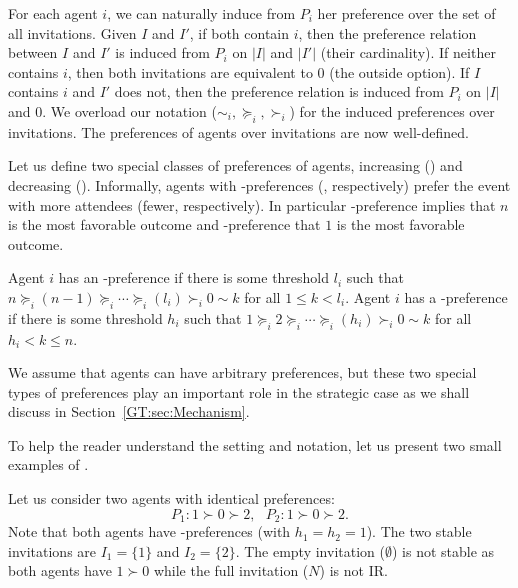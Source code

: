 For each agent $i$, we can naturally induce from $P_i$ her preference over the set of all invitations.
Given $I$ and $I'$, if both contain $i$, then the preference relation between $I$ and $I'$ is induced from $P_i$ on $|I|$ and $|I'|$ (their cardinality). If neither contains $i$, then both invitations are equivalent to $0$ (the outside option). If $I$ contains $i$ and $I'$ does not, then the preference relation is induced from $P_i$ on $|I|$ and $0$. 
We overload our notation ($\sim_i, \succeq_i, \succ_i$) for the induced preferences over invitations. 
The preferences of agents over invitations are now well-defined.

Let us define two special classes of preferences of agents, increasing (\INC) and decreasing (\DEC). Informally, agents with \INC-preferences (\DEC, respectively) prefer the event with more attendees (fewer, respectively). In particular \INC-preference implies that $n$ is the most favorable outcome and \DEC-preference that $1$ is the most favorable outcome.
\begin{definition}\label{GT:def:preferenceTypes}
Agent $i$ has an \INC-preference if there is some threshold $l_i$ such that 
$n \succeq_i (n-1) \succeq_i \cdots \succeq_i (l_i) \succ_i 0 \sim k$ for all $1 \leq k < l_i$. 
Agent $i$ has a \DEC-preference if there is some threshold $h_i$ such that 
$1 \succeq_i 2 \succeq_i \cdots \succeq_i (h_i) \succ_i 0 \sim k$ for all $h_i < k \leq n$. 
\end{definition}
We assume that agents can have arbitrary preferences, but these two special types of preferences play an important role in the strategic case as we shall discuss in Section~\ref{GT:sec:Mechanism}. 

To help the reader understand the setting and notation, let us present two small examples of \AOIP.

\begin{example} \label{GT:eg:multiple_stable}
	Let us consider two agents with identical preferences: 
	\begin{equation*}
				P_1: 1 \succ 0 \succ 2,~~~ P_2: 1 \succ 0 \succ 2.		
	\end{equation*}
	Note that both agents have \DEC-preferences (with $h_1 = h_2 = 1$).
	The two stable invitations are $I_1 = \{1\}$ and $I_2 = \{2\}$. 
	The empty invitation ($\emptyset$) is not stable as both agents have $1 \succ 0$ while the full invitation ($N$) is not IR. 
\end{example}

